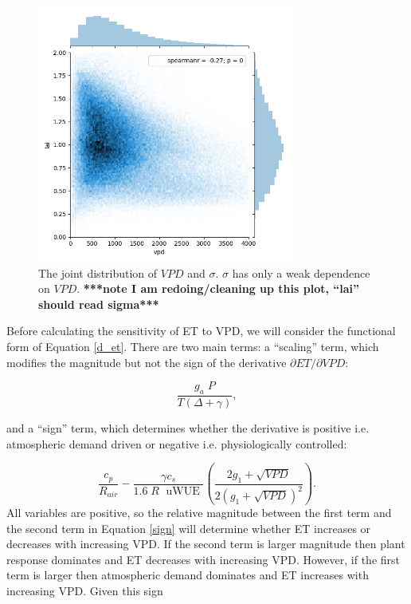 \documentclass[draft,linenumbers]{agujournal}
\begin{document}
\begin{figure}[h]
\centering
\includegraphics[width=20pc]{./fig03.png}
\caption{The joint distribution of $VPD$ and $\sigma$. $\sigma$ has only a weak dependence on $VPD$. \textbf{***note I am redoing/cleaning up this plot, ``lai'' should read sigma***}}
\label{lai_vpd_fig}
\end{figure}

Before calculating the sensitivity of ET to VPD, we will consider the functional form of Equation \ref{d_et}. There are two main terms: a ``scaling'' term, which modifies the magnitude but not the sign of the derivative $\partial ET/\partial VPD$:

\begin{equation}
  \frac{g_a \; P}{T(\Delta + \gamma)},
\end{equation}

and a ``sign'' term, which determines whether the derivative is positive i.e. atmospheric demand driven or negative i.e. physiologically controlled:

\begin{equation}
  \label{sign}
  \frac{c_p}{R_{air}} - \frac{\gamma c_s }{1.6 \; R\; \text{ uWUE }} \left( \frac{2 g_1 + \sqrt{VPD}}{2 (g_1 + \sqrt{VPD})^2}\right).
\end{equation}
All variables are positive, so the relative magnitude between the first term and the second term in Equation \ref{sign} will determine whether ET increases or decreases with increasing VPD. If the second term is larger magnitude then plant response dominates and ET decreases with increasing VPD. However, if the first term is larger then atmospheric demand dominates and ET increases with increasing VPD. Given this sign 
\end{document}
